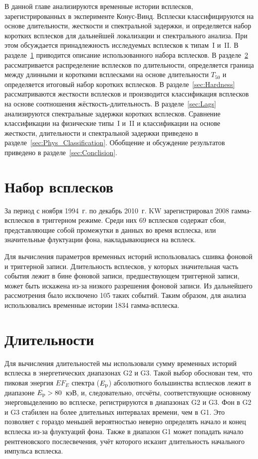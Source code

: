 В данной главе анализируются временные истории всплесков, зарегистрированных в 
эксперименте Конус-Винд. Всплески классифицируются на основе длительности, жесткости и 
спектральной задержки, и определяется набор коротких всплесков для дальнейшей локализации и спектрального анализа. 
При этом обсуждается принадлежность исследуемых всплесков к типам~I и~II. 
В разделе~\ref{sec:GRB_sample} приводится описание использованного набора всплесков. 
В разделе~\ref{sec:Durations} рассматривается распределение всплесков по длительности, 
определяется граница между длинными и короткими всплесками на основе 
длительности $T_{50}$ и определяется итоговый набор коротких всплесков. 
В разделе~\ref{sec:Hardness} рассматриваются жесткости всплесков и производится 
классификация всплесков на основе соотношения жёсткость-длительность. 
В разделе~\ref{sec:Lags} анализируются спектральные задержки коротких всплесков. 
Сравнение классификации на физические типы~I и~II и классификации на основе жесткости, 
длительности и спектральной задержки приведено в разделе~\ref{sec:Phys_Classification}. 
Обобщение и обсуждение результатов приведено в разделе~\ref{sec:Conclision}.  

\section{Набор всплесков}\label{sec:GRB_sample}
За период с ноября 1994~г. по декабрь 2010~г. KW зарегистрировал 2008 гамма-всплесков 
в триггерном режиме. Среди них 69 всплесков содержат сбои, представляющие собой 
промежутки в данных во время всплеска, или значительные флуктуации фона, 
накладывающиеся на всплеск. 

Для вычисления параметров временных историй использовалась 
сшивка фоновой и триггерной записи. Длительность всплесков, у которых значительная 
часть события лежит в бине фоновой записи, предшествующем триггерной записи, может быть 
искажена из-за низкого разрешения фоновой записи. Из дальнейшего рассмотрения 
было исключено 105 таких событий. Таким образом, для анализа использовались временные 
истории 1834 гамма-всплеска. 

\section{Длительности}\label{sec:Durations}
Для вычисления длительностей мы использовали сумму временных историй всплеска 
в энергетических диапазонах G2 и G3. Такой выбор обоснован тем, что  пиковая 
энергия $E F_{E}$ спектра ($E_{\mathrm{p}}$) абсолютного большинства всплесков лежит в 
диапазоне $E_{\mathrm{p}}>80$~кэВ, и, следовательно, отсчёты, соответствующие основному энерговыделению 
во всплеске, регистрируются в диапазонах G2 и G3. Фон в G2 и G3 стабилен на более 
длительных интервалах времени, чем в G1. Это позволяет с гораздо меньшей вероятностью 
неверно определять начало и конец всплеска из-за флуктуаций фона. Также в диапазон G1 
может попадать начало рентгеновского послесвечения, учёт которого исказит 
длительность начального импульса всплеска.

